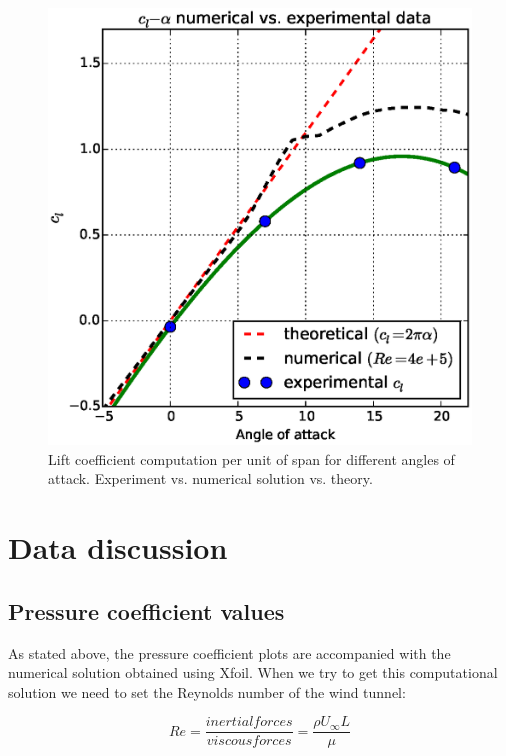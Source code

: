 \documentclass[10pt]{SelfArx} %
\begin{document}
\begin{figure}[ht!]
\centering
\includegraphics[scale=0.55]{plots/cl-alpha.eps}
\caption{Lift coefficient computation per unit of span for different angles of attack. Experiment vs. numerical solution vs. theory.}
\end{figure}

\newpage


\section{Data discussion}
\subsection{Pressure coefficient values}

As stated above, the pressure coefficient plots are accompanied with the numerical solution obtained using Xfoil. When we try to get this computational solution we need to set the Reynolds number of the wind tunnel:

\begin{equation} Re = \frac{inertial forces}{viscous forces}  = \frac{\rho U_{\infty} L}{\mu} \end{equation}
\end{document}
